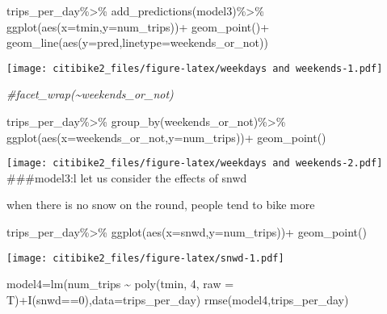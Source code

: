 \documentclass[
]{article}
\newenvironment{Shaded}{\begin{snugshade}}{\end{snugshade}}
\newcommand{\AttributeTok}[1]{\textcolor[rgb]{0.77,0.63,0.00}{#1}}
\newcommand{\CommentTok}[1]{\textcolor[rgb]{0.56,0.35,0.01}{\textit{#1}}}
\newcommand{\DecValTok}[1]{\textcolor[rgb]{0.00,0.00,0.81}{#1}}
\newcommand{\FunctionTok}[1]{\textcolor[rgb]{0.00,0.00,0.00}{#1}}
\newcommand{\NormalTok}[1]{#1}
\newcommand{\OtherTok}[1]{\textcolor[rgb]{0.56,0.35,0.01}{#1}}
\newcommand{\SpecialCharTok}[1]{\textcolor[rgb]{0.00,0.00,0.00}{#1}}
\begin{document}
\begin{Shaded}
\begin{Highlighting}[]
\NormalTok{trips\_per\_day}\SpecialCharTok{\%\textgreater{}\%}
  \FunctionTok{add\_predictions}\NormalTok{(model3)}\SpecialCharTok{\%\textgreater{}\%}
  \FunctionTok{ggplot}\NormalTok{(}\FunctionTok{aes}\NormalTok{(}\AttributeTok{x=}\NormalTok{tmin,}\AttributeTok{y=}\NormalTok{num\_trips))}\SpecialCharTok{+}
  \FunctionTok{geom\_point}\NormalTok{()}\SpecialCharTok{+}
  \FunctionTok{geom\_line}\NormalTok{(}\FunctionTok{aes}\NormalTok{(}\AttributeTok{y=}\NormalTok{pred,}\AttributeTok{linetype=}\NormalTok{weekends\_or\_not))}
\end{Highlighting}
\end{Shaded}

\texttt{[image: citibike2\_files/figure-latex/weekdays and weekends-1.pdf]}

\begin{Shaded}
\begin{Highlighting}[]
  \CommentTok{\#facet\_wrap(\textasciitilde{}weekends\_or\_not)}

\NormalTok{trips\_per\_day}\SpecialCharTok{\%\textgreater{}\%}
  \FunctionTok{group\_by}\NormalTok{(weekends\_or\_not)}\SpecialCharTok{\%\textgreater{}\%}
  \FunctionTok{ggplot}\NormalTok{(}\FunctionTok{aes}\NormalTok{(}\AttributeTok{x=}\NormalTok{weekends\_or\_not,}\AttributeTok{y=}\NormalTok{num\_trips))}\SpecialCharTok{+}
  \FunctionTok{geom\_point}\NormalTok{()}
\end{Highlighting}
\end{Shaded}

\texttt{[image: citibike2\_files/figure-latex/weekdays and weekends-2.pdf]}
\#\#\#model3:l let us consider the effects of snwd

when there is no snow on the round, people tend to bike more

\begin{Shaded}
\begin{Highlighting}[]
\NormalTok{trips\_per\_day}\SpecialCharTok{\%\textgreater{}\%}
  \FunctionTok{ggplot}\NormalTok{(}\FunctionTok{aes}\NormalTok{(}\AttributeTok{x=}\NormalTok{snwd,}\AttributeTok{y=}\NormalTok{num\_trips))}\SpecialCharTok{+}
  \FunctionTok{geom\_point}\NormalTok{()}
\end{Highlighting}
\end{Shaded}

\texttt{[image: citibike2\_files/figure-latex/snwd-1.pdf]}

\begin{Shaded}
\begin{Highlighting}[]
\NormalTok{model4}\OtherTok{=}\FunctionTok{lm}\NormalTok{(num\_trips }\SpecialCharTok{\textasciitilde{}} \FunctionTok{poly}\NormalTok{(tmin, }\DecValTok{4}\NormalTok{, }\AttributeTok{raw =}\NormalTok{ T)}\SpecialCharTok{+}\FunctionTok{I}\NormalTok{(snwd}\SpecialCharTok{==}\DecValTok{0}\NormalTok{),}\AttributeTok{data=}\NormalTok{trips\_per\_day)}
\FunctionTok{rmse}\NormalTok{(model4,trips\_per\_day)}
\end{Highlighting}
\end{Shaded}
\end{document}

